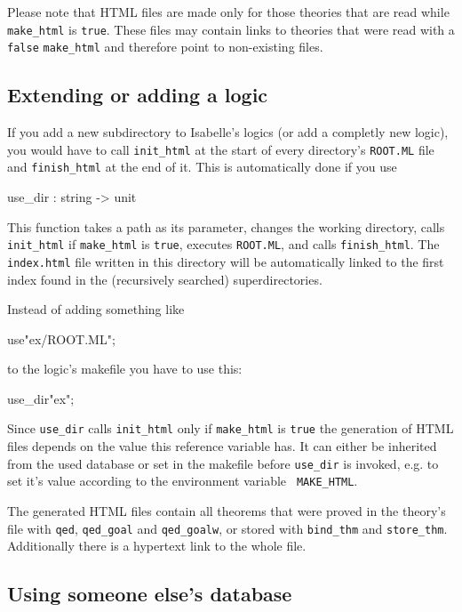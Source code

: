 Please note that HTML files are made only for those theories that are
read while {\tt make_html} is {\tt true}. These files may contain
links to theories that were read with a {\tt false} {\tt make_html}
and therefore point to non-existing files.


\subsection*{Extending or adding a logic}

If you add a new subdirectory to Isabelle's logics (or add a completly
new logic), you would have to call {\tt init_html} at the start of every
directory's {\tt ROOT.ML} file and {\tt finish_html} at the end of
it. This is automatically done if you use

\begin{ttbox}
use_dir : string -> unit
\end{ttbox}

This function takes a path as its parameter, changes the working
directory, calls {\tt init_html} if {\tt make_html} is {\tt true},
executes {\tt ROOT.ML}, and calls {\tt finish_html}. The {\tt
index.html} file written in this directory will be automatically
linked to the first index found in the (recursively searched)
superdirectories.

Instead of adding something like

\begin{ttbox}
use"ex/ROOT.ML";
\end{ttbox}

to the logic's makefile you have to use this:

\begin{ttbox}
use_dir"ex";
\end{ttbox}

Since {\tt use_dir} calls {\tt init_html} only if {\tt make_html} is
{\tt true} the generation of HTML files depends on the value this
reference variable has. It can either be inherited from the used \ML{}
database or set in the makefile before {\tt use_dir} is invoked,
e.g. to set it's value according to the environment variable {\tt
MAKE_HTML}.

The generated HTML files contain all theorems that were proved in the
theory's \ML{} file with {\tt qed}, {\tt qed_goal} and {\tt qed_goalw},
or stored with {\tt bind_thm} and {\tt store_thm}. Additionally there
is a hypertext link to the whole \ML{} file.


\subsection*{Using someone else's database}

